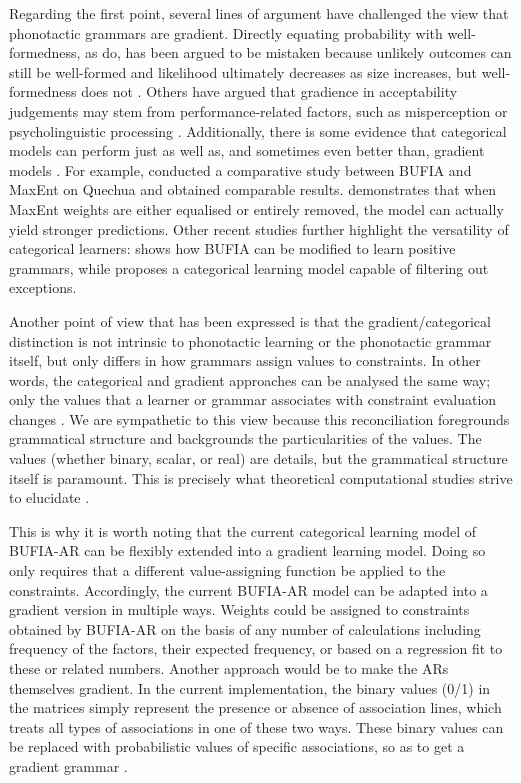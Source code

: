 \documentclass{CUP-JNL-PHO}%
\theoremstyle{definition}
\numberwithin{equation}{section}
\theoremstyle{definition}
\begin{document}
Regarding the first point, several lines of argument have challenged
the view that phonotactic grammars are gradient. Directly equating
probability with well-formedness, as \citet{hayes2008maximum} do, has
been argued to be mistaken because unlikely outcomes can still be
well-formed and likelihood ultimately decreases as size increases, but
well-formedness does not \citep{heinz2017computational}. Others have
argued that gradience in acceptability judgements may stem from
performance-related factors, such as misperception
\citep{kahng2023can} or psycholinguistic processing
\citep{Gorman2013}. Additionally, there is some evidence that
categorical models can perform just as well as, and sometimes even
better than, gradient models \citep{Gorman2013, Durvasula2020,
	KostyszynHeinz2021, Dai2025, Swanson+2025,durvasula2025closer}. For
example, \citet{Swanson+2025} conducted a comparative study between
BUFIA and MaxEnt on Quechua \citep{wilson2018accidental} and obtained
comparable results. \citet{durvasula2025closer} demonstrates that when
MaxEnt weights are either equalised or entirely removed, the model can
actually yield stronger predictions. Other recent studies further
highlight the versatility of categorical learners:
\citet{payne2024generalized} shows how BUFIA can be modified to learn
positive grammars, while \citet{Dai2025} proposes a categorical
learning model capable of filtering out exceptions.

Another point of view that has been expressed is that the
gradient/categorical distinction is not intrinsic to phonotactic
learning or the phonotactic grammar itself, but only differs in how
grammars assign values to constraints. In other words, the categorical
and gradient approaches can be analysed the same way; only the values
that a learner or grammar associates with constraint evaluation
changes \citep{goodman1999semiring, chandlee2017computational,
	mayerReconciling2025}. We are sympathetic to this view because this
reconciliation foregrounds grammatical structure and backgrounds the
particularities of the values. The values (whether binary, scalar, or
real) are details, but the grammatical structure itself is
paramount. This is precisely what theoretical computational studies
strive to elucidate \citep{heinzComputationalNaturePhonological2018}.

This is why it is worth noting that the current categorical learning
model of BUFIA-AR can be flexibly extended into a gradient learning
model. Doing so only requires that a different value-assigning
function be applied to the constraints. Accordingly, the current
BUFIA-AR model can be adapted into a gradient version in multiple
ways. Weights could be assigned to constraints obtained by BUFIA-AR on
the basis of any number of calculations including frequency of the
factors, their expected frequency, or based on a regression fit to
these or related numbers. Another approach would be to make the ARs
themselves gradient. In the current implementation, the binary values
(0/1) in the matrices simply represent the presence or absence of
association lines, which treats all types of associations in one of
these two ways. These binary values can be replaced with probabilistic
values of specific associations, so as to get a gradient grammar
\citep{SmolenskyGoldrick2013, Mayer2021}.
\end{document}

